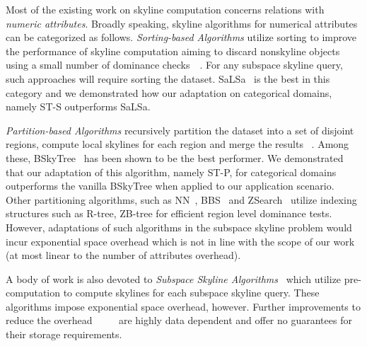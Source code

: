 Most of the existing work on skyline computation concerns relations with {\em numeric attributes}. Broadly speaking, skyline algorithms for numerical attributes can be categorized as follows. {\em Sorting-based Algorithms} utilize sorting to improve the performance of skyline computation aiming to discard nonskyline objects using a small number of dominance checks~\cite{chomicki2005skyline}~\cite{godfrey2005maximal}. For any subspace skyline query, such approaches will require sorting the dataset. SaLSa~\cite{bartolini2008efficient} is the best in this category and we demonstrated how our adaptation on categorical domains, namely ST-S outperforms SaLSa. 

{\em Partition-based Algorithms} recursively partition the dataset into a set of disjoint regions, compute local skylines for each region and merge the results 
\cite{borzsony2001skyline}~\cite{zhang2009scalable}. Among these, BSkyTree~\cite{lee2014scalable} has been shown to be the best performer. We
demonstrated that our adaptation of this algorithm, namely ST-P, for categorical domains outperforms the vanilla BSkyTree when applied to our application scenario. Other partitioning algorithms, such as  NN~\cite{kossmann2002shooting}, BBS~\cite{papadias2003optimal} 
and ZSearch~\cite{lee2007approaching} utilize indexing structures such as R-tree, ZB-tree for efficient region level dominance tests. However,
adaptations of such algorithms in the subspace skyline problem would incur exponential space overhead which is not in line with the scope
of our work (at most linear to the number of attributes overhead). 

A body of work is also devoted to {\em Subspace Skyline Algorithms}~\cite{yuan2005efficient, pei2005catching} which utilize pre-computation to
compute skylines for each subspace skyline query. These algorithms impose exponential space overhead, however. Further improvements
to reduce the overhead ~\cite{tao2006subsky}~\cite{xia2006refreshing}~\cite{xia2012online}~\cite{maabout2016skycube} are highly data
dependent and offer no guarantees for their storage requirements.